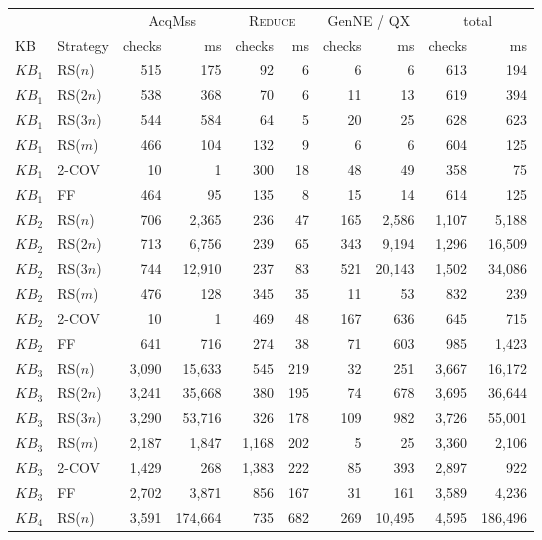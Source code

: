 \begin{tabular}{llrrrrrrrr}
\toprule
 &  & \multicolumn{2}{c}{AcqMss} & \multicolumn{2}{c}{\textsc{Reduce}} & \multicolumn{2}{c}{GenNE / QX} & \multicolumn{2}{c}{total} \\
\cmidrule(lr){3-4} \cmidrule(lr){5-6} \cmidrule(lr){7-8} \cmidrule(lr){9-10}
KB & Strategy & checks & ms & checks & ms & checks & ms & checks & ms \\
\midrule
$KB_1$ & RS($n$) & 515 & 175 & 92 & 6 & 6 & 6 & 613 & 194 \\
$KB_1$ & RS($2n$) & 538 & 368 & 70 & 6 & 11 & 13 & 619 & 394 \\
$KB_1$ & RS($3n$) & 544 & 584 & 64 & 5 & 20 & 25 & 628 & 623 \\
$KB_1$ & RS($m$) & 466 & 104 & 132 & 9 & 6 & 6 & 604 & 125 \\
$KB_1$ & 2-COV & 10 & 1 & 300 & 18 & 48 & 49 & 358 & 75 \\
$KB_1$ & FF & 464 & 95 & 135 & 8 & 15 & 14 & 614 & 125 \\
$KB_2$ & RS($n$) & 706 & 2{,}365 & 236 & 47 & 165 & 2{,}586 & 1{,}107 & 5{,}188 \\
$KB_2$ & RS($2n$) & 713 & 6{,}756 & 239 & 65 & 343 & 9{,}194 & 1{,}296 & 16{,}509 \\
$KB_2$ & RS($3n$) & 744 & 12{,}910 & 237 & 83 & 521 & 20{,}143 & 1{,}502 & 34{,}086 \\
$KB_2$ & RS($m$) & 476 & 128 & 345 & 35 & 11 & 53 & 832 & 239 \\
$KB_2$ & 2-COV & 10 & 1 & 469 & 48 & 167 & 636 & 645 & 715 \\
$KB_2$ & FF & 641 & 716 & 274 & 38 & 71 & 603 & 985 & 1{,}423 \\
$KB_3$ & RS($n$) & 3{,}090 & 15{,}633 & 545 & 219 & 32 & 251 & 3{,}667 & 16{,}172 \\
$KB_3$ & RS($2n$) & 3{,}241 & 35{,}668 & 380 & 195 & 74 & 678 & 3{,}695 & 36{,}644 \\
$KB_3$ & RS($3n$) & 3{,}290 & 53{,}716 & 326 & 178 & 109 & 982 & 3{,}726 & 55{,}001 \\
$KB_3$ & RS($m$) & 2{,}187 & 1{,}847 & 1{,}168 & 202 & 5 & 25 & 3{,}360 & 2{,}106 \\
$KB_3$ & 2-COV & 1{,}429 & 268 & 1{,}383 & 222 & 85 & 393 & 2{,}897 & 922 \\
$KB_3$ & FF & 2{,}702 & 3{,}871 & 856 & 167 & 31 & 161 & 3{,}589 & 4{,}236 \\
$KB_4$ & RS($n$) & 3{,}591 & 174{,}664 & 735 & 682 & 269 & 10{,}495 & 4{,}595 & 186{,}496 \\

\end{tabular}
